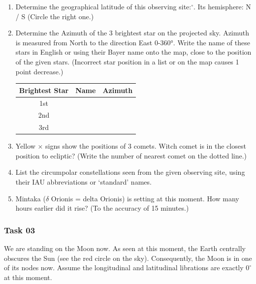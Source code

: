 \documentclass[a4paper,12pt]{extarticle}
\begin{document}
\begin{enumerate}
    \item Determine the geographical latitude of this observing site:\quad\quad $^\circ$. Its hemisphere: N / S (Circle the right one.)
    \item Determine the Azimuth of the 3 brightest star on the projected sky. Azimuth is measured from North to the direction East 0-360°. Write the name of these stars in English or using their Bayer name onto the map, close to the position of the given stars. (Incorrect star position in a list or on the map causes 1 point decrease.)
    
\begin{table}[H]
\centering
\begin{tabular}{|c|l|l|}
\hline
Brightest Star & \quad Name\;\; \; & Azimuth \\ \hline
1st            &                                               &         \\ \hline
2nd            &                                               &         \\ \hline
3rd            &                                               &         \\ \hline
\end{tabular}
\end{table}
    \item Yellow × signs show the positions of 3 comets. Witch comet is in the closest position to ecliptic? (Write the number of nearest comet on the dotted line.)
    \item List the circumpolar constellations seen from the given observing site, using their IAU abbreviations or ‘standard’ names.
    \item Mintaka ($\delta$ Orionis = delta Orionis) is setting at this moment. How many hours earlier did it rise? (To the accuracy of 15 minutes.)
\end{enumerate}

\subsubsection{Task 03}

We are standing on the Moon now. As seen at this moment, the Earth centrally obscures the Sun (see the red circle on the sky). Consequently, the Moon is in one of its nodes now. Assume the longitudinal and latitudinal librations are exactly $0^\circ$ at this moment.
\end{document}
